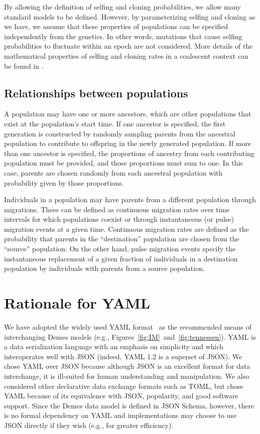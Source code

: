 \documentclass[11pt]{article}
\begin{document}
By allowing the definition of selfing and cloning probabilities, we allow many
standard models to be defined.
However, by parameterizing selfing and cloning as we have, we assume that these
properties of populations can be specified independently from the genetics.
In other words, mutations that cause selfing probabilities to fluctuate within
an epoch are not considered.
More details of the mathematical properties of selfing and cloning rates
in a coalescent context can be found in
\citet{nordborg1997coalescent,hartfield2016facsexcoal}.

\subsection{Relationships between populations}

A population may have one
or more ancestors, which are other populations that exist at the population's
start time. If one ancestor is specified, the first generation is constructed
by randomly sampling parents from the ancestral population to contribute to
offspring in the newly generated population. If more than one ancestor is
specified, the proportions of ancestry from each contributing population must
be provided, and those proportions must sum to one. In this case, parents are
chosen randomly from each ancestral population with probability given by those
proportions.

Individuals in a population may have parents from a different
population through migrations. These can be defined as continuous migration
rates over time intervals for which populations coexist or through
instantaneous (or pulse) migration events at a given time. Continuous migration
rates are defined as the probability that parents in the ``destination''
population are chosen from the ``source'' population.
On the other hand, pulse
migration events specify the instantaneous replacement of a given fraction of
individuals in a destination population by individuals with parents from a
source population.


\section{Rationale for YAML}\label{sec:appendix-spec}

We have adopted the widely
used YAML format~\citep{ben2009yaml} as the recommended means of interchanging
Demes models (e.g., Figures~\ref{fig:IM}~and~\ref{fig:tennessen}). YAML is a data
serialization language with an emphasis on simplicity and which interoperates well
with JSON (indeed, YAML 1.2 is a superset of JSON). We chose YAML over JSON
because although JSON is an excellent format for data interchange, it is
ill-suited for human understanding and manipulation. We also considered other
declarative data exchange formats such as TOML,
but chose YAML because of its equivalence with JSON,
popularity, and good software support.
Since the Demes data model is defined in JSON Schema,
however, there is no formal dependency on YAML and implementations may choose
to use JSON directly if they wish (e.g., for greater efficiency).
\end{document}
